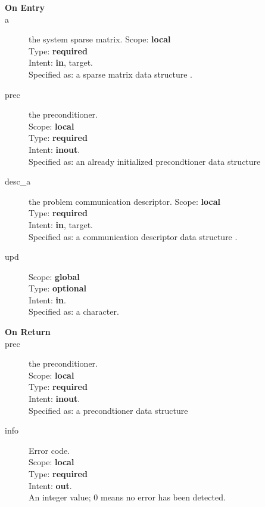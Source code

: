 

\begin{description}
\item[\bf On Entry]
\item[a] the system sparse matrix.
Scope: {\bf local} \\
Type: {\bf required}\\
Intent: {\bf in}, target.\\
Specified as: a sparse matrix data structure \spdata.
\item[prec] the preconditioner.\\
Scope: {\bf local} \\
Type: {\bf required}\\
Intent: {\bf inout}.\\
Specified as: an already initialized precondtioner data structure \precdata\\
\item[desc\_a] the problem communication descriptor. 
Scope: {\bf local} \\
Type: {\bf required}\\
Intent: {\bf in}, target.\\
Specified as: a communication descriptor data structure \descdata.
\item[upd] 
Scope: {\bf global} \\
Type: {\bf optional}\\
Intent: {\bf in}.\\
Specified as: a character.
\end{description}

\begin{description}
\item[\bf On Return]
\item[prec] the preconditioner.\\
Scope: {\bf local} \\
Type: {\bf required}\\
Intent: {\bf inout}.\\
Specified as: a precondtioner data structure \precdata\\
\item[info] Error code.\\
Scope: {\bf local} \\
Type: {\bf required} \\
Intent: {\bf out}.\\
An integer value; 0 means no error has been detected. 
\end{description}




